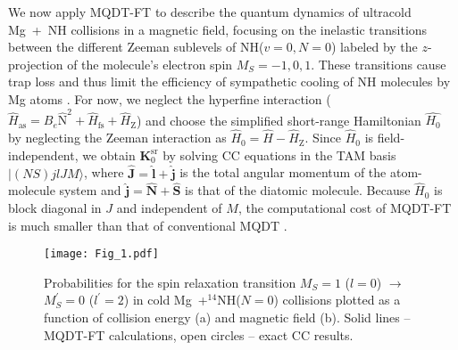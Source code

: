 \documentclass[reprint,amssymb,noeprint,twocolumn,longbibliography]{revtex4-2}
\begin{document}
We now apply MQDT-FT to describe the quantum dynamics of ultracold  Mg~+~NH collisions in a magnetic field, focusing on the inelastic transitions between the different Zeeman sublevels of NH($v=0, N=0$) labeled by the $z$-projection of the molecule's electron spin $M_S=-1,0,1$. These transitions cause trap loss and thus limit the efficiency of sympathetic cooling of NH molecules by Mg atoms \cite{Wallis_09}. 
For now, we neglect the hyperfine interaction ($\hat{H}_\text{as} = B_e\hat{\bm{\mathrm{N}}}^2 + \hat{H}_\text{fs}+ \hat{H}_\text{Z}$) and choose the simplified short-range Hamiltonian $\hat{H_0}$ 
by neglecting the Zeeman interaction as  
$\hat{H}_{0} = \hat{H} -\hat{H}_\text{Z}$.
Since $\hat{H}_{0}$ is field-independent, we obtain $\bm{K}_\mathrm{0}^{\text{sr}}$ by solving CC equations in the TAM 
basis  $|(NS)jlJM\rangle$, where  $\hat{\mathbf{J}}=\hat{\mathbf{l}} + \hat{\mathbf{j}}$  is the total angular momentum of the atom-molecule system and $\hat{\mathbf{j}}=\hat{\mathbf{N}} + \hat{\mathbf{S}}$ is that of the diatomic molecule.
Because $\hat{H}_{0}$ is block diagonal in $J$ and independent of $M$, 
the computational cost of MQDT-FT is much smaller than that of  conventional MQDT \cite{Croft_11}. 





\begin{figure}[t]
\begin{center}
\texttt{[image: Fig\_1.pdf]}
\end{center}
\vspace{-0.5cm}
\caption{
Probabilities for the spin relaxation transition $M_S=1$ ($l=0$) $\to$ $M^\prime_S=0$ ($l^\prime=2$) in cold  Mg~+$^{14}$NH($N=0$) collisions plotted as a function of collision energy (a) and magnetic field (b).
Solid lines -- MQDT-FT calculations, open circles -- exact CC results. }
\label{Fig_1}
\end{figure}
\end{document}
